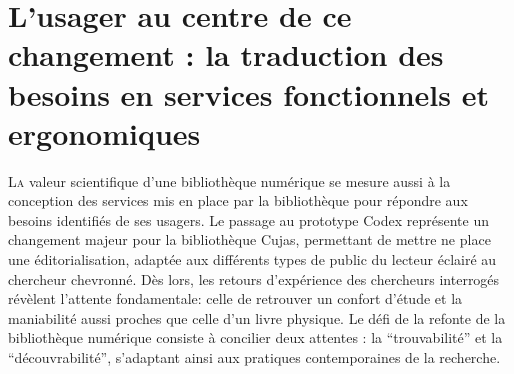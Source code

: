 \chapter[L'usage au centre du changement]{L'usager au centre de ce changement : la traduction des besoins en services fonctionnels et ergonomiques}

\lettrine{L}a valeur scientifique d'une bibliothèque numérique se mesure aussi à la conception des services mis en place par la bibliothèque pour répondre aux besoins identifiés de ses usagers. Le passage au prototype Codex représente un changement majeur pour la bibliothèque Cujas, permettant de mettre ne place une éditorialisation, adaptée aux différents types de public du lecteur éclairé au chercheur chevronné.
Dès lors, les retours d'expérience des chercheurs interrogés révèlent l'attente fondamentale: celle de retrouver un confort d'étude et la maniabilité aussi proches que celle d'un livre physique. Le défi de la refonte de la bibliothèque numérique consiste à concilier deux attentes : la \enquote{trouvabilité} et la \enquote{découvrabilité}, s'adaptant ainsi aux pratiques contemporaines de la recherche.



